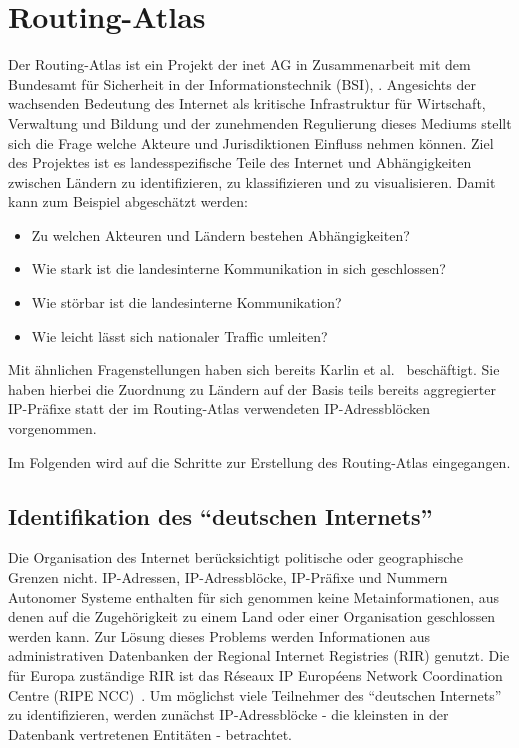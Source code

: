 \section{Routing-Atlas}\label{sec:atlas}

Der Routing-Atlas ist ein Projekt der inet AG in Zusammenarbeit mit dem Bundesamt für Sicherheit in der Informationstechnik (BSI), \vgl \cite{wsbh-envgi-12}.
Angesichts der wachsenden Bedeutung des Internet als kritische Infrastruktur für Wirtschaft, Verwaltung und Bildung und der zunehmenden Regulierung dieses Mediums stellt sich die Frage welche Akteure und Jurisdiktionen Einfluss nehmen können.
Ziel des Projektes ist es landesspezifische Teile des Internet und Abhängigkeiten zwischen Ländern zu identifizieren, zu klassifizieren und zu visualisieren.
Damit kann zum Beispiel abgeschätzt werden:
\begin{itemize}
 \item Zu welchen Akteuren und Ländern bestehen Abhängigkeiten?
 \item Wie stark ist die landesinterne Kommunikation in sich geschlossen?
 \item Wie störbar ist die landesinterne Kommunikation?
 \item Wie leicht lässt sich nationaler Traffic umleiten?
\end{itemize}

Mit ähnlichen Fragenstellungen haben sich bereits Karlin et al.~\cite{0903.3218v1} beschäftigt.
Sie haben hierbei die Zuordnung zu Ländern auf der Basis teils bereits aggregierter IP-Präfixe statt der im Routing-Atlas verwendeten IP-Adressblöcken vorgenommen.

Im Folgenden wird auf die Schritte zur Erstellung des Routing-Atlas eingegangen.

\subsection{Identifikation des "`deutschen Internets"'}
Die Organisation des Internet berücksichtigt politische oder geographische Grenzen nicht.
IP-Adressen, IP-Adressblöcke, IP-Präfixe und Nummern Autonomer Systeme enthalten für sich genommen keine Metainformationen, aus denen auf die Zugehörigkeit zu einem Land oder einer Organisation geschlossen werden kann.
Zur Lösung dieses Problems werden Informationen aus administrativen Datenbanken der Regional Internet Registries (RIR) genutzt.
Die für Europa zuständige RIR ist das Réseaux IP Européens Network Coordination Centre (RIPE NCC)~\cite{RIPE}.
Um möglichst viele Teilnehmer des "`deutschen Internets"' zu identifizieren, werden zunächst IP-Adressblöcke - die kleinsten in der Datenbank vertretenen Entitäten - betrachtet.

